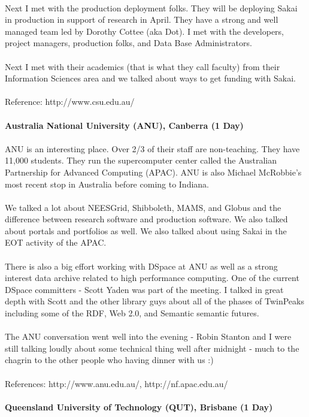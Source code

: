 \documentclass[12pt]{book}
\begin{document}
\\
Next I met with the production deployment folks.   They will be deploying Sakai in production in support of research in April.   They have a strong and well managed team led by Dorothy Cottee (aka Dot).   I met with the developers, project managers, production folks, and Data Base Administrators.   \\
\\
Next I met with their academics (that is what they call faculty) from their Information Sciences area and we talked about ways to get funding with Sakai.   \\
\\
Reference: http://www.csu.edu.au/\\
\\
{\bf Australia National University (ANU), Canberra (1 Day)}\\
\\
ANU is an interesting place.   Over 2/3 of their staff are non-teaching.   They have 11,000 students.   They run the supercomputer center called the Australian Partnership for Advanced Computing (APAC).   ANU is also Michael McRobbie's most recent stop in Australia before coming to Indiana.\\
\\
We talked a lot about NEESGrid, Shibboleth, MAMS, and Globus and the difference between research software and production software.   We also talked about portals and portfolios as well.   We also talked about using Sakai in the EOT activity of the APAC.\\
\\
There is also a big effort working with DSpace at ANU as well as a strong interest data archive related to high performance computing.   One of the current DSpace committers - Scott Yaden was part of the meeting.   I talked in great depth with Scott and the other library guys about all of the phases of TwinPeaks including some of the RDF, Web 2.0, and Semantic semantic futures.  \\
\\
The ANU conversation went well into the evening - Robin Stanton and I were still talking loudly about some technical thing well after midnight   - much to the chagrin to the other people who having dinner with us :)\\
\\
References: http://www.anu.edu.au/, http://nf.apac.edu.au/\\
\\
{\bf Queensland University of Technology (QUT), Brisbane (1 Day)}\\
\end{document}
